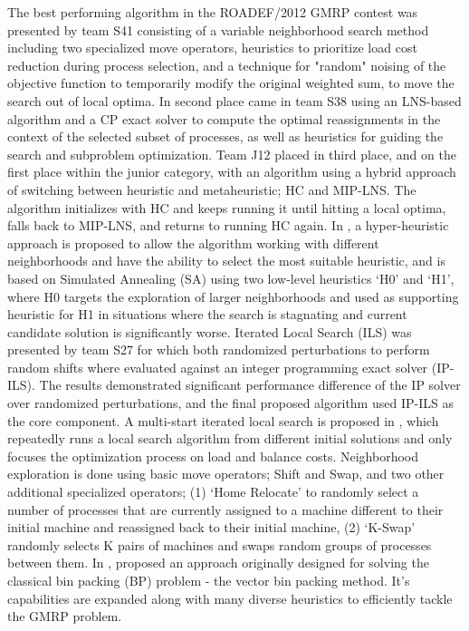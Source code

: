 \documentclass[a4paper,12pt]{Classes/RoboticsLaTeX}
\begin{document}
The best performing algorithm in the ROADEF/2012 GMRP contest was presented by team S41 consisting of a variable neighborhood search method including two specialized move operators, heuristics to prioritize load cost reduction during process selection, and a technique for "random" noising of the objective function to temporarily modify the original weighted sum, to move the search out of local optima.
\cite{gavranovic2012} 
In second place came in team S38 using an LNS-based algorithm and a CP exact solver to compute the optimal reassignments in the context of the selected subset of processes, as well as heuristics for guiding the search and subproblem optimization. 
\cite{mehta2012}
Team J12 placed in third place, and on the first place within the junior category, with an algorithm using a hybrid approach of switching between heuristic and metaheuristic; HC and MIP-LNS. The algorithm initializes with HC and keeps running it until hitting a local optima, falls back to MIP-LNS, and returns to running HC again.
\cite{jaskowski2016}
In \cite{hoffmann2015}, a hyper-heuristic approach is proposed to allow the algorithm working with different neighborhoods and have the ability to select the most suitable heuristic, and is based on Simulated Annealing (SA) using two low-level heuristics `H0' and `H1', where H0 targets the exploration of larger neighborhoods and used as supporting heuristic for H1 in situations where the search is stagnating and current candidate solution is significantly worse.
Iterated Local Search (ILS) was presented by team S27 \cite{lopes2015} for which both randomized perturbations to perform random shifts where evaluated against an integer programming exact solver (IP-ILS). The results demonstrated significant performance difference of the IP solver over randomized perturbations, and the final proposed algorithm used IP-ILS as the core component.
A multi-start iterated local search is proposed in \cite{masson2013}, which repeatedly runs a local search algorithm from different initial solutions and only focuses the optimization process on load and balance costs. Neighborhood exploration is done using basic move operators; Shift and Swap, and two other additional specialized operators; (1) `Home Relocate' to randomly select a number of processes that are currently assigned to a machine different to their initial machine and reassigned back to their initial machine, (2) `K-Swap' randomly selects K pairs of machines and swaps random groups of processes between them.
In \cite{gabay2016}, proposed an approach originally designed for solving the classical bin packing (BP) problem - the vector bin packing method. It's capabilities are expanded along with many diverse heuristics to efficiently tackle the GMRP problem.
\end{document}
